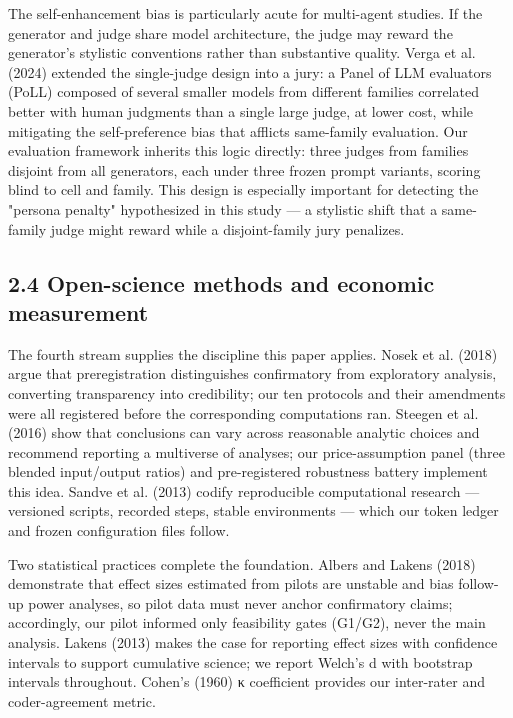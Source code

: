 \documentclass[11pt,a4paper]{article}
\begin{document}
The self-enhancement bias is particularly acute for multi-agent studies. If
the generator and judge share model architecture, the judge may reward the
generator's stylistic conventions rather than substantive quality. Verga et
al. (2024) extended the single-judge design into a jury: a Panel of LLM
evaluators (PoLL) composed of several smaller models from different families
correlated better with human judgments than a single large judge, at lower
cost, while mitigating the self-preference bias that afflicts same-family
evaluation. Our evaluation framework inherits this logic directly: three
judges from families disjoint from all generators, each under three frozen
prompt variants, scoring blind to cell and family. This design is especially
important for detecting the "persona penalty" hypothesized in this study —
a stylistic shift that a same-family judge might reward while a
disjoint-family jury penalizes.

\subsection{2.4 Open-science methods and economic measurement}

The fourth stream supplies the discipline this paper applies. Nosek et al.
(2018) argue that preregistration distinguishes confirmatory from
exploratory analysis, converting transparency into credibility; our ten
protocols and their amendments were all registered before the corresponding
computations ran. Steegen et al. (2016) show that conclusions can vary
across reasonable analytic choices and recommend reporting a multiverse of
analyses; our price-assumption panel (three blended input/output ratios)
and pre-registered robustness battery implement this idea. Sandve et al.
(2013) codify reproducible computational research — versioned scripts,
recorded steps, stable environments — which our token ledger and frozen
configuration files follow.

Two statistical practices complete the foundation. Albers and Lakens
(2018) demonstrate that effect sizes estimated from pilots are unstable and
bias follow-up power analyses, so pilot data must never anchor confirmatory
claims; accordingly, our pilot informed only feasibility gates (G1/G2), never
the main analysis. Lakens (2013) makes the case for reporting effect sizes
with confidence intervals to support cumulative science; we report Welch's d
with bootstrap intervals throughout. Cohen's (1960) κ coefficient provides
our inter-rater and coder-agreement metric.
\end{document}
